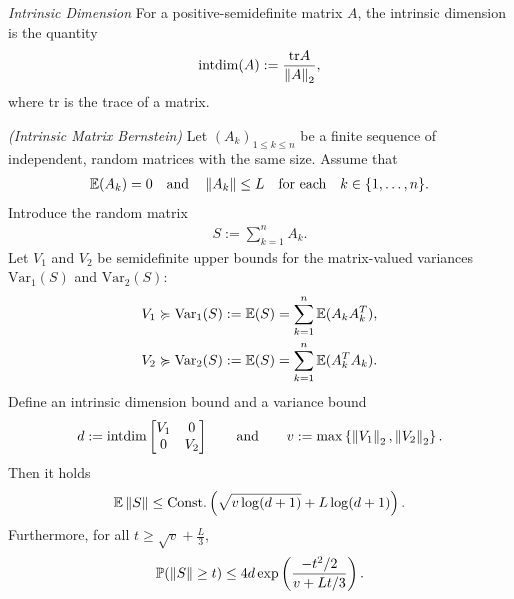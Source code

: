 \begin{definition}
  \emph{Intrinsic Dimension}
  \label{rmineq_intrinsic_bernstein}
  For a positive-semidefinite matrix $A$,
  the intrinsic dimension is the quantity
  \begin{gather*}
    \text{intdim}
    (A)
    :=
    \frac{\text{tr}A}{\left\lVert A\right\rVert_2}
    ,
  \end{gather*}
  where tr is the trace of a matrix.
\end{definition}
\begin{theorem}
  \emph{(Intrinsic Matrix Bernstein)}
  \label{rmineq_bernstein}
  Let $(A_k)_{1\le k \le n}$  be a finite sequence of independent, random matrices with the same size. Assume that
    \begin{gather}
      \mathbb{E}(A_k)=0\quad\text{and}\quad\left\lVert A_k\right\rVert\le L \quad \text{for each}\quad  k\in \{1,\ldots,n\}.
    \end{gather}
  Introduce the random matrix
      \begin{gather*}
        S:=\sum_{k=1}^n A_k.
      \end{gather*}
  Let 
  $V_1$ 
  and
  $V_2$ 
  be semidefinite upper bounds for the matrix-valued variances
  $\text{Var}_1(S)$
  and
  $\text{Var}_2(S)$:
  \begin{align*}
    V_1 
    &\succcurlyeq 
    \text{Var}_1(S)
    :=
    \mathbb{E}(S)
    =
    \sum_{k = 1}^{n}
    \mathbb{E}(A_k A_k^T),\\
    V_2 
    &\succcurlyeq 
    \text{Var}_2(S)
    :=
    \mathbb{E}(S)
    =
    \sum_{k = 1}^{n}
    \mathbb{E}(A_k^T A_k)
    .
  \end{align*}
  Define an intrinsic dimension bound and a variance bound
  \begin{gather}
    \label{ rmineq_intrinsic_bernstein_intdim_var_bound }
    d
    :=
    \text{intdim}
    \begin{bmatrix}
      V_1 & 0 \\
      0   & V_2
    \end{bmatrix}
    \qquad
    \text{and}
    \qquad
    v
    :=
    \max
    \left\{ \left\lVert V_1\right\rVert_2, \left\lVert V_2\right\rVert_2 \right\}
    .
  \end{gather}
  Then 
  it holds
      \begin{align}
        \label{rmineq_intrinsic_bernstein_expectation_bound}
        \mathbb{E}\left\lVert S\right\rVert\le \text{Const.}\left( \sqrt{v\log(d+1)} + L\log(d+1) \right).
      \end{align}
    Furthermore, for all 
  $
    t
    \ge
    \sqrt{v}
    +
    \frac{L}{3}
  $,
      \begin{gather}
        \label{rmineq_intrinsic_bernstein_probability_bound}
        \mathbb{P}(\left\lVert S\right\rVert\ge t)\le 4d \exp\left(\frac{-t^2/2}{v+Lt/3} \right).
      \end{gather}
\end{theorem}

